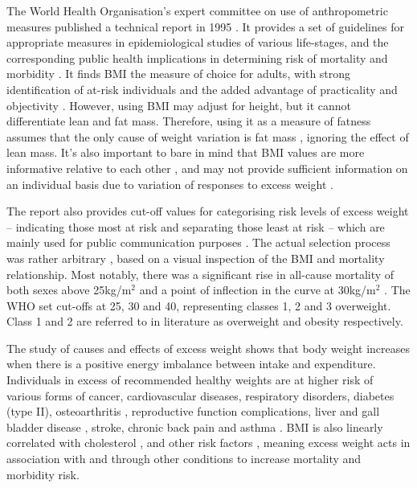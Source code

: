 \documentclass[12pt,a4paper]{article}
\begin{document}
The World Health Organisation's expert committee on use of anthropometric measures published a technical report in 1995 \citep{who1995}. It provides a set of guidelines for appropriate measures in epidemiological studies of various life-stages, and the corresponding public health implications in determining risk of mortality and morbidity \citep{onis96}. It finds BMI the measure of choice for adults, with strong identification of at-risk individuals \citep{who1995} and the added advantage of practicality and objectivity \citep{willett99}. However, using BMI may adjust for height, but it cannot differentiate lean and fat mass. Therefore, using it as a measure of fatness assumes that the only cause of weight variation is fat mass \citep{kopelman2000}, ignoring the effect of lean mass. It's also important to bare in mind that BMI values are more informative relative to each other \citep{onis96}, and may not provide sufficient information on an individual basis due to variation of responses to excess weight \citep{kopelman2000}.

The report also provides cut-off values for categorising risk levels of excess weight -- indicating those most at risk and separating those least at risk -- which are mainly used for public communication purposes \citep{stevens11}. The actual selection process was rather arbitrary \citep{who1995}, based on a visual inspection of the BMI and mortality relationship. Most notably, there was a significant rise in all-cause mortality of both sexes above 25kg/m$^2$ \citep{stevens98} and a point of inflection in the curve at 30kg/m$^2$ \citep{who1995}. The WHO set cut-offs at 25, 30 and 40, representing classes 1, 2 and 3 overweight. Class 1 and 2 are referred to in literature as overweight and obesity respectively. 

The study of causes and effects \citep{haslam05,kopelman2000} of excess weight shows that body weight increases when there is a positive energy imbalance between intake and expenditure. Individuals in excess of recommended healthy weights are at higher risk of various forms of cancer, cardiovascular diseases, respiratory disorders, diabetes (type II), osteoarthritis \citep{kopelman2000, haslam05}, reproductive function complications, liver and gall bladder disease \citep{kopelman2007}, stroke, chronic back pain and asthma \citep{guh09}. BMI is also linearly correlated with cholesterol \citep{ezzati05}, and other risk factors \citep{ezzati02}, meaning excess weight acts in association with and through other conditions to increase mortality and morbidity risk.
	
\end{document}
